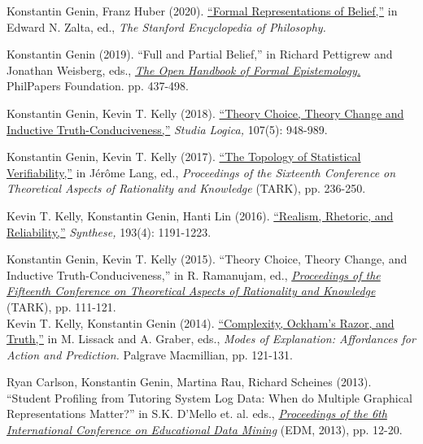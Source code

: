 \documentclass[12pt]{res} %
\begin{document}
\begin{resume}
Konstantin Genin, Franz Huber (2020). {\href{https://plato.stanford.edu/entries/formal-belief/}{``Formal Representations of Belief,''}} in Edward N. Zalta, ed., {\em The Stanford Encyclopedia of Philosophy.}

Konstantin Genin (2019). {``Full and Partial Belief,''} in Richard Pettigrew and Jonathan Weisberg, eds., \href{https://philpapers.org/archive/PETTOH-2.pdf}{{\em The Open Handbook of Formal Epistemology.}} PhilPapers Foundation. pp. 437-498.   

Konstantin Genin, Kevin T. Kelly (2018). \href{https://doi.org/10.1007/s11225-018-9809-5}{{``Theory Choice, Theory Change and Inductive Truth-Conduciveness,''}} {\em Studia Logica,} 107(5): 948-989. 

Konstantin Genin, Kevin T. Kelly (2017). \href{https://doi.org/10.4204/EPTCS.251.17}{``The Topology of Statistical Verifiability,''} in J\'{e}r\^{o}me Lang, ed., {\em Proceedings of the Sixteenth Conference on Theoretical Aspects of Rationality and Knowledge} (TARK), pp. 236-250. 

Kevin T. Kelly, Konstantin Genin, Hanti Lin (2016). \href{https://doi.org/10.1007/s11229-015-0993-9}{``Realism, Rhetoric, and Reliability,''} {\em Synthese,} 193(4): 1191-1223. 

Konstantin Genin, Kevin T. Kelly (2015). {``Theory Choice, Theory Change, and Inductive Truth-Conduciveness,''} in R. Ramanujam, ed., \href{https://www.imsc.res.in/tark/TARK2015-proceedings.pdf}{{\em Proceedings of the Fifteenth Conference on Theoretical Aspects of Rationality and Knowledge}} (TARK), pp. 111-121.\\ 

Kevin T. Kelly, Konstantin Genin (2014). \href{http://dx.doi.org/10.1057/9781137403865_9}{``Complexity, Ockham's Razor, and Truth,''} in M. Lissack and A. Graber, eds.,  {\em Modes of Explanation: Affordances for Action and Prediction.} Palgrave Macmillian, pp. 121-131.

Ryan Carlson, Konstantin Genin, Martina Rau, Richard Scheines (2013). ``Student Profiling from Tutoring System Log Data: When do Multiple Graphical Representations Matter?'' in S.K. D'Mello et. al. eds., \href{http://www.educationaldatamining.org/EDM2013/proceedings/EDM2013Proceedings.pdf}{\em Proceedings of the 6th International Conference on Educational Data Mining} (EDM, 2013), pp. 12-20.





\end{resume}
\end{document}
